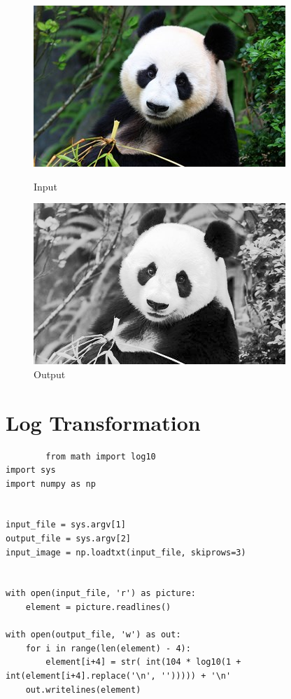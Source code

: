 \documentclass[a4paper,8pt]{article}
\begin{document}
        \begin{figure}[H]
        \centering
        \begin{minipage}{0.4\linewidth}
        \centering
        \includegraphics[width=\linewidth]{output/input1.jpg}
        \caption{Input}
        \end{minipage}
        \hfill
        \begin{minipage}{0.4\linewidth}
        \centering
        \includegraphics[width=\linewidth]{output/Histogram Equalization_output.png}
        \caption{Output}
        \end{minipage}
        \end{figure}
        \clearpage
        
        \section{Log Transformation}
        \begin{verbatim}
        from math import log10
import sys
import numpy as np


input_file = sys.argv[1]
output_file = sys.argv[2]
input_image = np.loadtxt(input_file, skiprows=3)


with open(input_file, 'r') as picture:
    element = picture.readlines()

with open(output_file, 'w') as out:
    for i in range(len(element) - 4):
        element[i+4] = str( int(104 * log10(1 + int(element[i+4].replace('\n', ''))))) + '\n'
    out.writelines(element)

        \end{verbatim}
        
\end{document}
